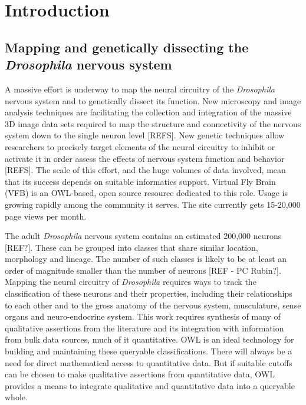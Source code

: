 \documentclass[runningheads,a4paper]{llncs}
\begin{document}
\section{Introduction}


\subsection{Mapping and genetically dissecting the \textit{Drosophila}
  nervous system}


A massive effort is underway to map the neural circuitry of the
\textit{Drosophila} nervous system and to genetically dissect its
function. New microscopy and image analysis techniques are
facilitating the collection and integration of the massive 3D image
data sets required to map the structure and connectivity of the
nervous system down to the single neuron level [REFS]. New genetic %
techniques allow researchers to precisely target elements of the
neural circuitry to inhibit or activate it in order assess the effects
of nervous system function and behavior [REFS]. The scale of this %
effort, and the huge volumes of data involved, mean that its success
depends on suitable informatics support. Virtual Fly Brain (VFB)
\cite{pmid22180411,pmid22402613} is an OWL-based, open source
resource dedicated to this role. Usage is growing rapidly among the community
it serves.  The site currently gets 15-20,000 page views per month.

The adult \textit{Drosophila} nervous system contains an estimated
200,000 neurons [REF?].  These can be grouped into classes that share
similar location, morphology and lineage.  The number of such classes
is likely to be at least an order of magnitude smaller than the number
of neurons [REF - PC Rubin?].  Mapping the neural circuitry of \textit{Drosophila}
requires ways to track the classification of these neurons and their
properties, including their relationships to each other and to the
gross anatomy of the nervous system, musculature, sense organs and
neuro-endocrine system.  This work requires synthesis of many of
qualitative assertions from the literature and its integration with
information from bulk data sources, much of it quantitative.  OWL
is an ideal technology for building and maintaining these queryable
classifications. There will always be a need for direct mathematical
access to quantitative data.  But if suitable cutoffs can be
chosen to make qualitative assertions from quantitative data, OWL
provides a means to integrate qualitative and quantitative data into a
queryable whole.
\end{document}
